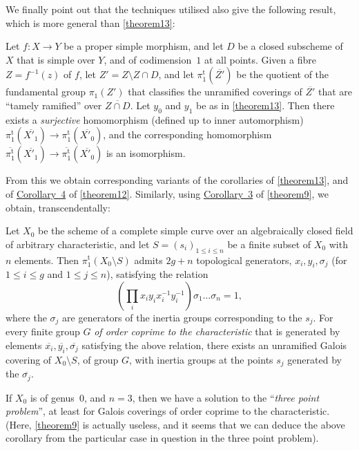 \documentclass{article}
\theoremstyle{plain}
\newenvironment{theorem}[1]
  {\renewcommand\theinnercustomtheorem{#1}\innercustomtheorem}
  {\endinnercustomtheorem}
\newenvironment{corollary}[1]
  {\renewcommand\theinnercustomcorollary{#1}\innercustomcorollary}
  {\endinnercustomcorollary}
\theoremstyle{definition}
\renewcommand{\leq}{\leqslant}
\newcommand{\oldpage}[1]{\marginpar{\footnotesize$\Big\vert$ \textit{p.~#1}}}
\begin{document}
We finally point out that the techniques utilised also give the following result, which is more general than \cref{theorem13}:

\begin{theorem}{14}
\label{theorem14}
  Let $f\colon X\to Y$ be a proper simple morphism, and let $D$ be a closed subscheme of $X$ that is simple over $Y$, and of codimension~$1$ at all points.
  Given a fibre $Z=f^{-1}(z)$ of $f$, let $Z'=Z\setminus Z\cap D$, and let $\pi_1^\mathrm{t}(\overline{Z'})$ be the quotient of the fundamental group $\pi_1(Z')$ that classifies the unramified coverings of $\overline{Z'}$ that are ``tamely ramified'' over $\overline{Z\cap D}$.
  Let $y_0$ and $y_1$ be as in \cref{theorem13}.
  Then there exists a \emph{surjective} homomorphism (defined up to inner automorphism) $\pi_1^\mathrm{t}(\overline{X'_1})\to\pi_1^\mathrm{t}(\overline{X'_0})$, and the corresponding homomorphism $\overline{\pi_1^\mathrm{t}}(\overline{X'_1})\to\overline{\pi_1^\mathrm{t}}(\overline{X'_0})$ is an isomorphism.
\end{theorem}

From this we obtain corresponding variants of the corollaries of \cref{theorem13}, and of \hyperref[theorem12corollary4]{Corollary~4} of \cref{theorem12}.
Similarly, using \hyperref[theorem9corollary3]{Corollary~3} of \cref{theorem9}, we obtain, transcendentally:

\begin{corollary}{1}
\label{theorem14corollary1}
  Let $X_0$ be the scheme of a complete simple curve over an algebraically closed field of arbitrary characteristic, and let $S=(s_i)_{1\leq i\leq n}$ be a finite subset of $X_0$ with $n$ elements.
  Then $\pi_1^\mathrm{t}(X_0\setminus S)$ admits $2g+n$ topological generators, $x_i,y_i,\sigma_j$ (for $1\leq i\leq g$ and $1\leq j\leq n$), satisfying the relation
  \[
    \left(\prod_i x_iy_ix_i^{-1}y_i^{-1}\right)\sigma_1\ldots\sigma_n = 1,
  \]
  where the $\sigma_j$ are generators of the inertia groups corresponding to the $s_j$.
  For every finite group $G$ \emph{of order coprime to the characteristic} that is generated by elements $\overline{x_i},\overline{y_i},\overline{\sigma_j}$ satisfying the above relation, there exists an unramified Galois covering of $X_0\setminus S$, of group $G$, with inertia groups at the points $s_j$ generated by the $\overline{\sigma_j}$.
\end{corollary}

If $X_0$ is of genus~$0$, and $n=3$, then we have a solution to the
\oldpage{182-28}
``\emph{three point problem}'', at least for Galois coverings of order coprime to the characteristic.
(Here, \cref{theorem9} is actually useless, and it seems that we can deduce the above corollary from the particular case in question in the three point problem).
\end{document}
